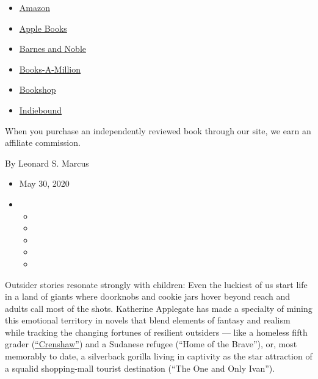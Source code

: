 \begin{itemize}
\tightlist
\item
  \href{https://www.amazon.com/gp/search?index=books\&tag=NYTBSREV-20\&field-keywords=The+One+and+Only+Bob+Katherine+Applegate}{Amazon}
\item
  \href{https://du-gae-books-dot-nyt-du-prd.appspot.com/buy?title=The+One+and+Only+Bob\&author=Katherine+Applegate}{Apple
  Books}
\item
  \href{https://www.anrdoezrs.net/click-7990613-11819508?url=https\%3A\%2F\%2Fwww.barnesandnoble.com\%2Fw\%2F\%3Fean\%3D9780062991317}{Barnes
  and Noble}
\item
  \href{https://www.anrdoezrs.net/click-7990613-35140?url=https\%3A\%2F\%2Fwww.booksamillion.com\%2Fp\%2FThe\%2BOne\%2Band\%2BOnly\%2BBob\%2FKatherine\%2BApplegate\%2F9780062991317}{Books-A-Million}
\item
  \href{https://bookshop.org/a/3546/9780062991317}{Bookshop}
\item
  \href{https://www.indiebound.org/book/9780062991317?aff=NYT}{Indiebound}
\end{itemize}

When you purchase an independently reviewed book through our site, we
earn an affiliate commission.

By Leonard S. Marcus

\begin{itemize}
\item
  May 30, 2020
\item
  \begin{itemize}
  \item
  \item
  \item
  \item
  \item
  \end{itemize}
\end{itemize}

Outsider stories resonate strongly with children: Even the luckiest of
us start life in a land of giants where doorknobs and cookie jars hover
beyond reach and adults call most of the shots. Katherine Applegate has
made a specialty of mining this emotional territory in novels that blend
elements of fantasy and realism while tracking the changing fortunes of
resilient outsiders --- like a homeless fifth grader
(\href{https://www.nytimes3xbfgragh.onion/2015/11/08/books/review/crenshaw-by-katherine-applegate.html}{``Crenshaw''})
and a Sudanese refugee (``Home of the Brave''), or, most memorably to
date, a silverback gorilla living in captivity as the star attraction of
a squalid shopping-mall tourist destination (``The One and Only Ivan'').

